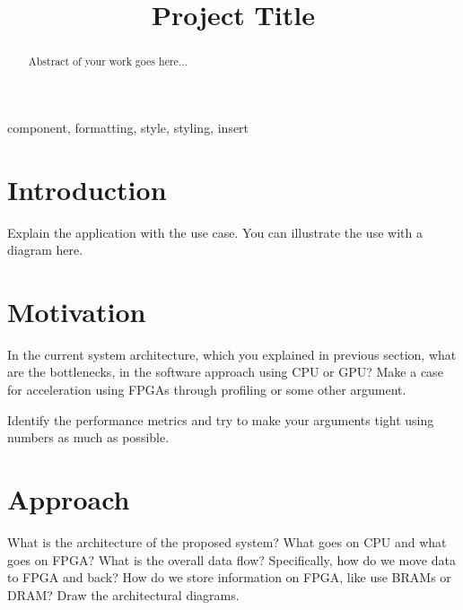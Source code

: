 \documentclass[conference]{IEEEtran}
\begin{document}
\title{Project Title}

\author{
\and
{}
}

\maketitle

\begin{abstract}
Abstract of your work goes here...
\end{abstract}

\begin{IEEEkeywords}
component, formatting, style, styling, insert
\end{IEEEkeywords}

\section{Introduction}
Explain the application with the use case.  You can illustrate the use with a
diagram here.

\section{Motivation}
In the current system architecture, which you explained in previous section,
what are the bottlenecks, in the software approach using CPU or GPU?  Make a
case for acceleration using FPGAs through profiling or some other argument. 

Identify the performance metrics and try to make your arguments tight using 
numbers as much as possible.

\section{Approach}

What is the architecture of the proposed system? What goes on CPU and what 
goes on FPGA? What is the overall data flow? Specifically, how do we move data
to FPGA and back? How do we store information on FPGA, like use BRAMs or DRAM?
Draw the architectural diagrams. 
\end{document}
